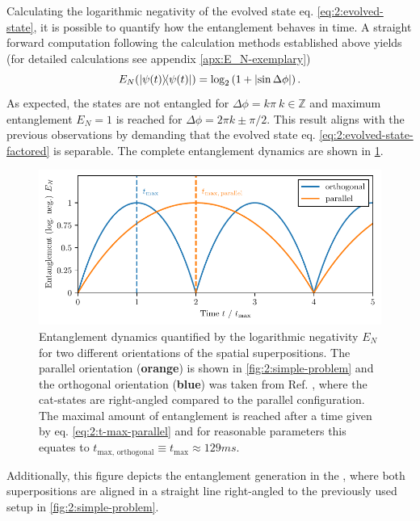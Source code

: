 Calculating the logarithmic negativity of the evolved state eq. \eqref{eq:2:evolved-state}, it is possible to quantify how the entanglement behaves in time. A straight forward computation following the calculation methods established above yields (for detailed calculations see appendix \ref{apx:E_N-exemplary})
\begin{equation}\label{eq:2:entanglement-dynamics-parallel}
  E_N(\ketbra{\psi(t)}) = \log_2\left(1 + \left\lvert\sin \Delta\phi\right\rvert\right) .
\end{equation}
As expected, the states are not entangled for $\Delta\phi = k\pi \ k\in\mathbb{Z}$ and maximum entanglement $E_N = 1$  is reached
for $\Delta\phi = 2\pi k \pm \pi/2$.
This result aligns with the previous observations by
demanding that the evolved state eq. \eqref{eq:2:evolved-state-factored}  is separable.
The complete entanglement dynamics are shown in \cref{fig:2:entanglement-dynamics}.
\begin{figure}[!htbp]
  \centering
  \includegraphics[width=\textwidth]{./../figures/ideal-entanglement/EN-time.pdf}
  \caption{Entanglement dynamics quantified by the logarithmic negativity $E_N$ for two different orientations of the spatial superpositions. The parallel orientation (\textbf{orange}) is shown in \cref{fig:2:simple-problem} and the orthogonal orientation (\textbf{blue}) was taken from Ref. \cite{Pedernales_2023}, where the cat-states are right-angled compared to the parallel configuration. The maximal amount of entanglement is reached after a time given by eq. \eqref{eq:2:t-max-parallel} and for reasonable parameters this equates to $t_\mathrm{max,\,orthogonal} \equiv t_\mathrm{max} \approx 129\si{ms}$.}
  \label{fig:2:entanglement-dynamics}
\end{figure}
Additionally, this figure depicts the entanglement generation in the , where both superpositions are aligned in a straight line right-angled to the previously used setup in \cref{fig:2:simple-problem}.

